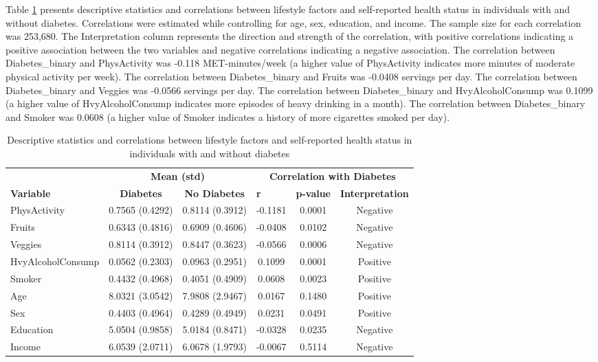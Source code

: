 \documentclass[12pt]{article}
\begin{document}
Table \ref{tab:table2} presents descriptive statistics and correlations between lifestyle factors and self-reported health status in individuals with and without diabetes. Correlations were estimated while controlling for age, sex, education, and income. The sample size for each correlation was 253,680. The Interpretation column represents the direction and strength of the correlation, with positive correlations indicating a positive association between the two variables and negative correlations indicating a negative association. The correlation between Diabetes\_binary and PhysActivity was -0.118 MET-minutes/week (a higher value of PhysActivity indicates more minutes of moderate physical activity per week). The correlation between Diabetes\_binary and Fruits was -0.0408 servings per day. The correlation between Diabetes\_binary and Veggies was -0.0566 servings per day. The correlation between Diabetes\_binary and HvyAlcoholConsump was 0.1099 (a higher value of HvyAlcoholConsump indicates more episodes of heavy drinking in a month). The correlation between Diabetes\_binary and Smoker was 0.0608 (a higher value of Smoker indicates a history of more cigarettes smoked per day).\begin{table}[h!]
\centering
\caption{Descriptive statistics and correlations between lifestyle factors and self-reported health status in individuals with and without diabetes}
\label{tab:table2}
\begin{tabular}{@{}lccccc@{}}
\toprule
\multicolumn{1}{c}{} & \multicolumn{2}{c}{\textbf{Mean (std)}} & \multicolumn{3}{c}{\textbf{Correlation with Diabetes}} \\ \cmidrule(lr){2-3} \cmidrule(lr){4-6}
\textbf{Variable} & \textbf{Diabetes} & \textbf{No Diabetes} & \multicolumn{1}{l}{\textbf{r}} & \multicolumn{1}{l}{\textbf{p-value}} & \multicolumn{1}{l}{\textbf{Interpretation}} \\ \midrule
PhysActivity & 0.7565 (0.4292) & 0.8114 (0.3912) & -0.1181 & 0.0001 & Negative \\
Fruits & 0.6343 (0.4816) & 0.6909 (0.4606) & -0.0408 & 0.0102 & Negative \\
Veggies & 0.8114 (0.3912) & 0.8447 (0.3623) & -0.0566 & 0.0006 & Negative \\
HvyAlcoholConsump & 0.0562 (0.2303) & 0.0963 (0.2951) & 0.1099 & 0.0001 & Positive \\
Smoker & 0.4432 (0.4968) & 0.4051 (0.4909) & 0.0608 & 0.0023 & Positive \\
Age & 8.0321 (3.0542) & 7.9808 (2.9467) & 0.0167 & 0.1480 & Positive \\
Sex & 0.4403 (0.4964) & 0.4289 (0.4949) & 0.0231 & 0.0491 & Positive \\
Education & 5.0504 (0.9858) & 5.0184 (0.8471) & -0.0328 & 0.0235 & Negative \\
Income & 6.0539 (2.0711) & 6.0678 (1.9793) & -0.0067 & 0.5114 & Negative \\ \bottomrule
\end{tabular}
\end{table}
\end{document}
